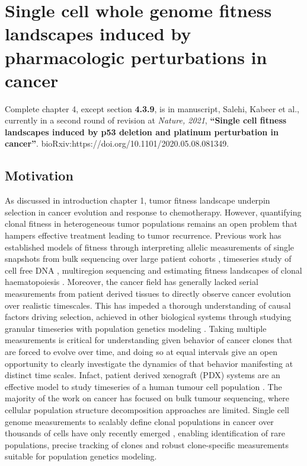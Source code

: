 
{\chapter{Single  cell  whole genome fitness  landscapes  induced  by pharmacologic perturbations in cancer}
}
\label{ch:Chapter4}
Complete chapter 4, except section \textbf{4.3.9}, is in manuscript, Salehi, Kabeer et al., currently in a second round of revision at \textit{Nature, 2021}, \textbf{``Single cell fitness landscapes induced by p53 deletion and platinum perturbation in cancer''}. bioRxiv:https://doi.org/10.1101/2020.05.08.081349.

\section{Motivation}
As discussed in introduction chapter 1, tumor fitness landscape underpin selection in cancer evolution and response to chemotherapy. However, quantifying clonal fitness in heterogeneous tumor populations remains an open problem that hampers effective treatment leading to tumor recurrence. Previous work has established models of fitness through interpreting allelic measurements of single snapshots \cite{williams2016identification, williams2018quantification,gerstung2020evolutionary,shah2012clonal,nik2012life} from bulk sequencing over large patient cohorts \cite{martincorena2017universal}, timeseries study of cell free DNA \cite{khan2018longitudinal}, multiregion sequencing \cite{Gerlinger2014-qd,Jamal-Hanjani2017-yc,Lopez2020-ku,mcpherson2016divergent,williams2018quantification} and estimating fitness landscapes of clonal haematopoiesis \cite{Watson2020-yu}. Moreover, the cancer field has generally lacked serial measurements from patient derived tissues to directly observe cancer evolution over realistic timescales. This has impeded a thorough understanding of causal factors driving selection, achieved in other biological systems through studying granular timeseries with population genetics modeling \cite{good2017dynamics}. Taking multiple measurements is critical for understanding  given behavior of cancer clones that are forced to evolve over time, and doing so at equal intervals give an open opportunity to clearly investigate the dynamics of that behavior manifesting at distinct time scales. Infact, patient derived xenograft (PDX)\cite{aparicio2015examining} systems are an effective model to study timeseries of a human tumour cell population \cite{williams2018using,willey2015patient}.
The majority of the work on cancer has focused on bulk tumour sequencing, where cellular population structure decomposition approaches are limited. Single cell genome measurements to scalably define clonal populations in cancer over thousands of cells have only recently emerged \cite{Laks2019-dm,zahn2017scalable}, enabling identification of rare populations, precise tracking of clones and robust clone-specific measurements suitable for population genetics modeling. 
